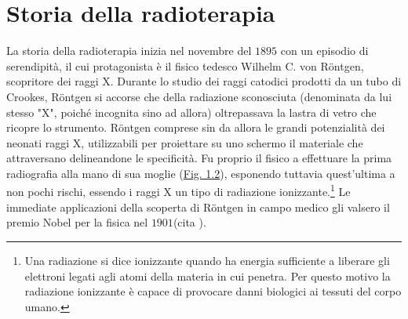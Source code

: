 \documentclass[12pt,a4paper,twoside]{report}
\begin{document}
	\section{Storia della radioterapia}
	La storia della radioterapia inizia nel novembre del $1895$ con un episodio di serendipità, il cui protagonista è il fisico tedesco Wilhelm C. von Röntgen, scopritore dei raggi X. Durante lo studio dei raggi catodici prodotti da un tubo di Crookes, Röntgen si accorse che della radiazione sconosciuta (denominata da lui stesso "X", poiché incognita sino ad allora) oltrepassava la lastra di vetro che ricopre lo strumento. Röntgen comprese sin da allora le grandi potenzialità dei neonati raggi X, utilizzabili per proiettare su uno schermo il materiale che attraversano delineandone le specificità. Fu proprio il fisico a effettuare la prima radiografia alla mano di sua moglie (\hyperref[fig:rongten]{Fig. 1.2}), esponendo tuttavia quest'ultima a non pochi rischi, essendo i raggi X un tipo di radiazione ionizzante.\footnote{Una radiazione si dice ionizzante quando ha energia sufficiente a liberare gli elettroni legati agli atomi della materia in cui penetra. Per questo motivo la radiazione ionizzante è capace di provocare danni biologici ai tessuti del corpo umano.} Le immediate applicazioni della scoperta di Röntgen in campo medico gli valsero il premio Nobel per la fisica nel $1901$(cita
	).
	
\end{document}
